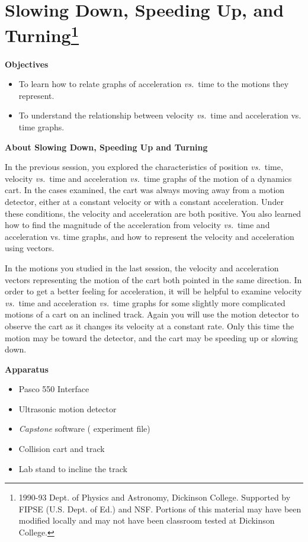 
\section{Slowing Down, Speeding Up, and Turning\footnote{
1990-93 Dept. of Physics and Astronomy, Dickinson College. Supported by FIPSE
(U.S. Dept. of Ed.) and NSF. Portions of this material may have been modified
locally and may not have been classroom tested at Dickinson College.
}}

\makelabheader %

\medskip
\textbf{Objectives }

\begin{itemize}
\item To learn how to relate graphs of acceleration \textit{vs.}~time to the motions they represent. 
\item To understand the relationship between velocity \textit{vs.}~time and acceleration vs.
time graphs.
\end{itemize}

\medskip
\textbf{About Slowing Down, Speeding Up and Turning }

In the previous session, you explored the characteristics of position \textit{vs.}~time,
velocity \textit{vs.}~time and acceleration  \textit{vs.}~time graphs of the motion of a dynamics
cart. In the cases examined, the cart was always moving away from a motion detector,
either at a constant velocity or with a constant acceleration. Under these conditions,
the velocity and acceleration are both positive. You also learned how to find
the magnitude of the acceleration from velocity \textit{vs.}~time and acceleration vs.
time graphs, and how to represent the velocity and acceleration using vectors. 

In the motions you studied in the last session, the velocity and acceleration
vectors representing the motion of the cart both pointed in the same direction.
In order to get a better feeling for acceleration, it will be helpful to examine
velocity \textit{vs.}~time and acceleration \textit{vs.}~time graphs for some slightly more complicated
motions of a cart on an inclined track. Again you will use the motion detector
to observe the cart as it changes its velocity at a constant rate. Only this
time the motion may be toward the detector, and the cart may be speeding up
or slowing down.

\medskip
\textbf{Apparatus }

\begin{itemize}
\item Pasco 550 Interface
\item Ultrasonic motion detector 
\item \textit{Capstone} software ( experiment file)
\item Collision cart and track 
\item Lab stand to incline the track
\end{itemize}

